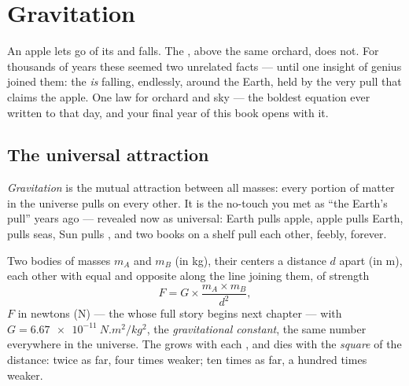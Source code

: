 \chapter{Gravitation}\label{ch:g9:gravitation}

An apple lets go of its  and falls. The , above the
same orchard, does not. For thousands of years these seemed two
unrelated facts --- until one insight of genius joined them:
the  \emph{is} falling, endlessly, around the Earth, held
by the very pull that claims the apple. One law for orchard
and sky --- the boldest equation ever written to that day, and
your final year of this book opens with it.

\section{The universal attraction}

\begin{definition}[Gravitation]\label{def:g9:gravitation:gravitation}
\emph{Gravitation} is the mutual attraction
between all masses: every portion of matter in the universe
pulls on every other. It is the no-touch  you met as
``the Earth's pull'' years ago --- revealed now as universal:
Earth pulls apple, apple pulls Earth,  pulls seas, Sun
pulls , and two books on a shelf pull each other,
feebly, forever.
\end{definition}

\begin{proposition}\label{prop:g9:gravitation:law}
Two bodies of masses $m_A$ and $m_B$ (in \unit{kg}), their
centers a distance $d$ apart (in \unit{m}),  each other
with equal and opposite  along the line joining them, of
strength
\[
F = G \times \frac{m_A \times m_B}{d^2},
\]
$F$ in newtons (\unit{N}) --- the   whose full story
begins next chapter --- with
$G = \qty{6.67e-11}{N.m^2/kg^2}$, the \emph{gravitational
constant}, the same number everywhere in the universe. The
 grows with each , and dies with the \emph{square}
of the distance: twice as far, four times weaker; ten times
as far, a hundred times weaker.
\end{proposition}

